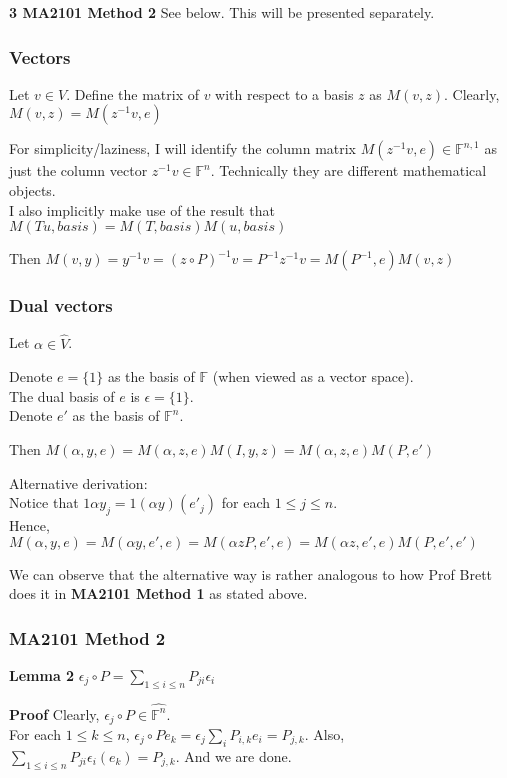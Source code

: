 \documentclass{article}
\begin{document}
\textbf{3 MA2101 Method 2}
See below. This will be presented separately.

\subsubsection{Vectors}
Let $v\in V$. Define the matrix of $v$ with respect to a basis $z$ as $M(v, z)$. Clearly, $M(v, z)=M(z^{-1}v, e)$

For simplicity/laziness, I will identify the column matrix $M(z^{-1}v, e)\in \mathbb{F}^{n,1}$ as just the column vector $z^{-1}v\in \mathbb{F}^n$. Technically they are different mathematical objects.\\
I also implicitly make use of the result that $M(Tu, basis)=M(T, basis)M(u, basis)$

Then $M(v, y) = y^{-1}v = (z\circ P)^{-1}v = P^{-1}z^{-1}v = M(P^{-1}, e)M(v, z)$



\subsubsection{Dual vectors}
Let $\alpha \in \hat{V}$. 

Denote $e=\{1\}$ as the basis of $\mathbb{F}$ (when viewed as a vector space).\\
The dual basis of $e$ is $\epsilon=\{1\}$.\\
Denote $e'$ as the basis of $\mathbb{F}^n$.

Then $M(\alpha, y, e) = M(\alpha, z, e)M(I, y, z) = M(\alpha, z, e)M(P, e')$

Alternative derivation:\\
Notice that $1\alpha y_j = 1(\alpha y)(e'_j)$ for each $1\leq j\leq n$.\\
Hence, $M(\alpha, y, e) = M(\alpha y, e', e) = M(\alpha zP, e', e) = M(\alpha z, e', e)M(P, e', e')$

We can observe that the alternative way is rather analogous to how Prof Brett does it in \textbf{MA2101 Method 1} as stated above.

\subsubsection{MA2101 Method 2}
\textbf{Lemma 2} $\epsilon_j \circ P = \sum_{1\leq i\leq n}P_{ji}\epsilon_i$

\textbf{Proof} Clearly, $\epsilon_j \circ P\in \hat{\mathbb{F}^n}$. \\
For each $1\leq k\leq n$, $\epsilon_j \circ P e_k = \epsilon_j \sum_i P_{i,k} e_i = P_{j,k}$. Also, $\sum_{1\leq i\leq n}P_{ji}\epsilon_i (e_k) = P_{j,k}$. And we are done.
\end{document}
